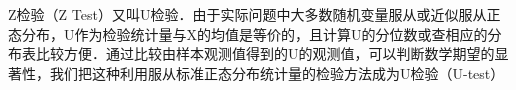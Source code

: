 Z检验（Z Test）又叫U检验．由于实际问题中大多数随机变量服从或近似服从正态分布，U作为检验统计量与X的均值是等价的，且计算U的分位数或查相应的分布表比较方便．通过比较由样本观测值得到的U的观测值，可以判断数学期望的显著性，我们把这种利用服从标准正态分布统计量的检验方法成为U检验（U-test）
